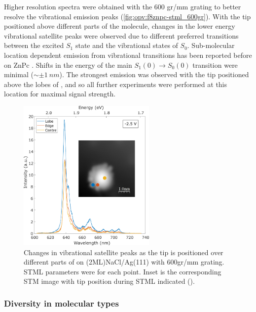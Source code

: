 Higher resolution spectra were obtained with the 600 gr/mm grating to better resolve the vibrational emission peaks (\autoref{fig:opv:f8znpc-stml_600gr}). With the tip positioned above different parts of the molecule, changes in the lower energy vibrational satellite peaks were observed due to different preferred transitions between the excited $S_1$ state and the vibrational states of $S_0$. Sub-molecular location dependent emission from vibrational transitions has been reported before on ZnPc \citep{Zhang2016,Doppagne2017}. Shifts in the energy of the main $S_1(0) \rightarrow S_0(0)$ transition were minimal ($\sim \pm \SI{1}{nm}$). The strongest emission was observed with the tip positioned above the lobes of , and so all further experiments were performed at this location for maximal signal strength.


\begin{figure}[H]
    \centering
        \includegraphics[width=0.6\textwidth]{pictures/f8znpc_-ve_emission_inset600_position.png}
        \caption{Changes in vibrational satellite peaks as the tip is positioned over different parts of  on (2ML)NaCl/Ag(111) with 600gr/mm grating. STML parameters were  for each point. Inset is the corresponding STM image with tip position during STML indicated ().}
        \label{fig:opv:f8znpc-stml_600gr}
\end{figure}



\subsubsection*{Diversity in molecular types}

